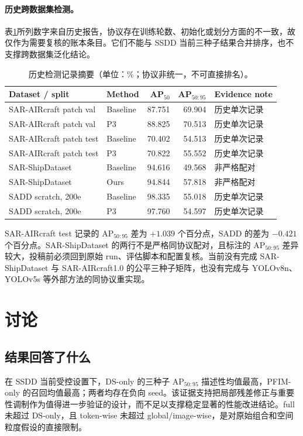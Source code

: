 \documentclass[UTF8,12pt,a4paper]{ctexart}
\begin{document}
\paragraph{历史跨数据集检测。}
表\ref{tab:histdet}所列数字来自历史报告，协议存在训练轮数、初始化或划分方面的不一致，故仅作为需要复核的账本条目。它们不能与 SSDD 当前三种子结果合并排序，也不支撑跨数据集泛化结论。
\begin{table}[H]\centering\small
\caption{历史检测记录摘要（单位：\%；协议非统一，不可直接排名）。}
\label{tab:histdet}
\begin{tabular}{llrrl}
\toprule
Dataset / split & Method & AP$_{50}$ & AP$_{50:95}$ & Evidence note\\
\midrule
SAR-AIRcraft patch val & Baseline & 87.751 & 69.904 & 历史单次记录\\
SAR-AIRcraft patch val & P3 & 88.825 & 70.513 & 历史单次记录\\
SAR-AIRcraft patch test & Baseline & 70.402 & 54.513 & 历史单次记录\\
SAR-AIRcraft patch test & P3 & 70.822 & 55.552 & 历史单次记录\\
SAR-ShipDataset & Baseline & 94.616 & 49.568 & 非严格配对\\
SAR-ShipDataset & Ours & 94.844 & 57.818 & 非严格配对\\
SADD scratch, 200e & Baseline & 98.335 & 55.018 & 历史单次记录\\
SADD scratch, 200e & P3 & 97.760 & 54.597 & 历史单次记录\\
\bottomrule
\end{tabular}
\end{table}
SAR-AIRcraft test 记录的 AP$_{50:95}$ 差为 $+1.039$ 个百分点，SADD 的差为 $-0.421$ 个百分点。SAR-ShipDataset 的两行不是严格同协议配对，且标注的 AP$_{50:95}$ 差异较大，投稿前必须回到原始 run、评估脚本和配置复核。当前没有完成 SAR-ShipDataset 与 SAR-AIRcraft1.0 的公平三种子矩阵，也没有完成与 YOLOv8n、YOLOv5s 等外部方法的同协议重实现。

\section{讨论}
\subsection{结果回答了什么}
在 SSDD 当前受控设置下，DS-only 的三种子 AP$_{50:95}$ 描述性均值最高，PFIM-only 的召回均值最高；两者均存在负向 seed。该证据支持把局部残差修正与重要性调制作为值得进一步验证的设计，而不足以支撑稳定显著的性能改进结论。full 未超过 DS-only，且 token-wise 未超过 global/image-wise，是对原始组合和空间粒度假设的直接限制。
\end{document}
